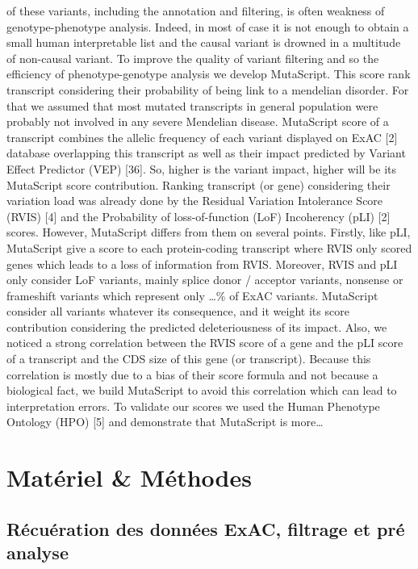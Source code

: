 \documentclass[12pt,twoside]{reedthesis}
\theoremstyle{definition}
\theoremstyle{definition}
\theoremstyle{remark}
\begin{document}
  of these variants, including the annotation and filtering, is often
  weakness of genotype-phenotype analysis. Indeed, in most of case it is
  not enough to obtain a small human interpretable list and the causal
  variant is drowned in a multitude of non-causal variant. To improve the
  quality of variant filtering and so the efficiency of phenotype-genotype
  analysis we develop MutaScript. This score rank transcript considering
  their probability of being link to a mendelian disorder. For that we
  assumed that most mutated transcripts in general population were
  probably not involved in any severe Mendelian disease. MutaScript score
  of a transcript combines the allelic frequency of each variant displayed
  on ExAC {[}2{]} database overlapping this transcript as well as their
  impact predicted by Variant Effect Predictor (VEP) {[}36{]}. So, higher
  is the variant impact, higher will be its MutaScript score contribution.
  Ranking transcript (or gene) considering their variation load was
  already done by the Residual Variation Intolerance Score (RVIS) {[}4{]}
  and the Probability of loss-of-function (LoF) Incoherency (pLI) {[}2{]}
  scores. However, MutaScript differs from them on several points.
  Firstly, like pLI, MutaScript give a score to each protein-coding
  transcript where RVIS only scored genes which leads to a loss of
  information from RVIS. Moreover, RVIS and pLI only consider LoF
  variants, mainly splice donor / acceptor variants, nonsense or
  frameshift variants which represent only \ldots{}\% of ExAC variants.
  MutaScript consider all variants whatever its consequence, and it weight
  its score contribution considering the predicted deleteriousness of its
  impact. Also, we noticed a strong correlation between the RVIS score of
  a gene and the pLI score of a transcript and the CDS size of this gene
  (or transcript). Because this correlation is mostly due to a bias of
  their score formula and not because a biological fact, we build
  MutaScript to avoid this correlation which can lead to interpretation
  errors. To validate our scores we used the Human Phenotype Ontology
  (HPO) {[}5{]} and demonstrate that MutaScript is more\ldots{}
  
  \section{Matériel \& Méthodes}\label{materiel-methodes}
  
  \subsection{Récuération des données ExAC, filtrage et pré
  analyse}\label{recueration-des-donnees-exac-filtrage-et-pre-analyse}
  
\end{document}
